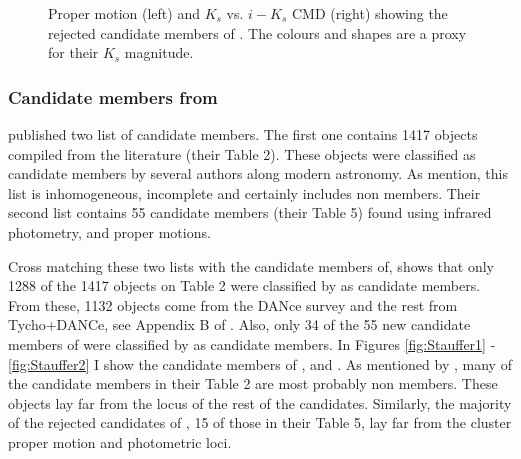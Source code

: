 \begin{figure}[htbp]
\begin{center}
\caption{Proper motion (left) and $K_s$ vs. $i-K_s$ CMD (right) showing the rejected candidate members of \citet{Bouy2015}. The colours and shapes are a proxy for their $K_s$ magnitude.}
\label{figure:rejectedsCOLORS}
\end{center}
\end{figure}
\subsubsection{Candidate members from \citet{Stauffer2007}}

\citet{Stauffer2007} published two list of candidate members. The first one contains 1417 objects compiled from the literature (their Table 2). These objects were classified as candidate members by several authors along modern astronomy. As \citet{Stauffer2007} mention, this list is inhomogeneous, incomplete and certainly includes non members. Their second list contains 55 candidate members  (their Table 5) found using infrared photometry, and proper motions.

Cross matching these two lists with the candidate members of\citet{Bouy2015}, shows that only 1288 of the 1417 objects on \citet{Stauffer2007} Table 2 were classified by \citet{Bouy2015} as candidate members. From these, 1132 objects come from the DANce survey and the rest from Tycho+DANCe, see Appendix B of \citet{Bouy2015}. Also, only 34 of the 55 new candidate members of  \citet{Stauffer2007} were classified by \citet{Bouy2015} as candidate members. In Figures \ref{fig:Stauffer1} - \ref{fig:Stauffer2} I show the candidate members of \citet{Stauffer2007}, and \citet{Bouy2015}. As mentioned by \citet{Stauffer2007}, many of the candidate members in their Table 2 are most probably non members. These objects lay far from the locus of the rest of the candidates. Similarly, the majority of the rejected candidates of \citet{Stauffer2007}, 15 of those in their Table 5, lay far from the cluster proper motion and photometric loci.

